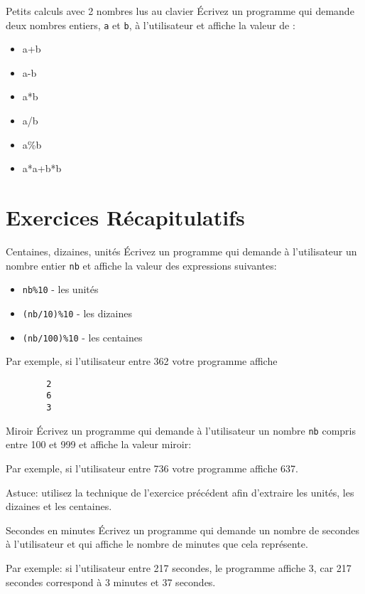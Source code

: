 \documentclass[a4paper,11pt]{style-esi/td}
\begin{document}
\begin{Exercice}{Petits calculs avec 2 nombres lus au clavier}
	\'Ecrivez un programme qui demande
	deux nombres entiers, \texttt{a} et \texttt{b}, à l'utilisateur et affiche la
	valeur de :
	\begin{itemize}
		\item a+b
		\item a-b
		\item a*b
		\item a/b
		\item a\%b
		\item a*a+b*b
	\end{itemize}
\end{Exercice}


\section{Exercices Récapitulatifs}


\begin{Exercice}{Centaines, dizaines, unités}
	\'Ecrivez un programme qui demande à l'utilisateur
	un nombre entier \texttt{nb} et affiche la valeur des
	expressions suivantes:
	\begin{itemize}
		\item \texttt{nb\%10} - les unités
		\item \texttt{(nb/10)\%10} - les dizaines
		\item \texttt{(nb/100)\%10} - les centaines
	\end{itemize}
	Par exemple, si l'utilisateur entre 362 votre programme affiche
	\begin{verbatim}
		2
		6
		3
		\end{verbatim}
\end{Exercice}

\begin{Exercice}{Miroir}
	\'Ecrivez un programme qui demande à l'utilisateur
	un nombre \texttt{nb} compris entre 100 et 999 et affiche la valeur miroir:

	Par exemple, si l'utilisateur entre 736 votre programme affiche 637.

	Astuce: utilisez la technique de l'exercice précédent afin d'extraire les
	unités, les dizaines et les centaines.
\end{Exercice}


\begin{Exercice}{Secondes en minutes}
	\'Ecrivez un programme qui demande un nombre de secondes à l'utilisateur
	et qui affiche le nombre de minutes que cela représente.

	Par exemple:
	si l'utilisateur entre 217 secondes, le programme affiche 3,
	car 217 secondes correspond à 3 minutes et 37 secondes.
\end{Exercice}
\end{document}
